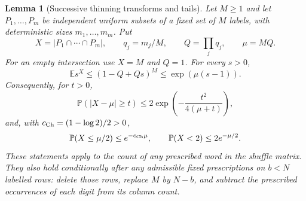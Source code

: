 \documentclass[11pt]{article}
\numberwithin{equation}{section}
\newtheorem{lemma}[lemma]{Lemma}
\newcommand{\E}{\mathbb E}
\newcommand{\Pp}{\mathbb P}
\newcommand{\1}{\mathbf 1}
\begin{document}
\begin{lemma}[Successive thinning transforms and tails]
\label{lem:successive-thinning-tail}
Let \(M\ge1\) and let \(P_1,\ldots,P_m\) be independent uniform
subsets of a fixed set of \(M\) labels, with deterministic sizes
\(m_1,\ldots,m_m\). Put
\[
 X=|P_1\cap\cdots\cap P_m|,\qquad
 q_j=m_j/M,\qquad Q=\prod_jq_j,\qquad \mu=MQ.
\]
For an empty intersection use \(X=M\) and \(Q=1\). For every \(s>0\),
\begin{equation}
\label{eq:thinning-transform}
 \E s^X\le(1-Q+Qs)^M\le \exp(\mu(s-1)).
\end{equation}
Consequently, for \(t>0\),
\begin{equation}
\label{eq:thinning-bernstein}
 \Pp(|X-\mu|\ge t)\le
 2\exp\left(-\frac{t^2}{4(\mu+t)}\right),
\end{equation}
and, with \(c_{\rm Ch}=(1-\log2)/2>0\),
\begin{equation}
\label{eq:thinning-lower-tail}
 \Pp(X\le\mu/2)\le e^{-c_{\rm Ch}\mu},
 \qquad \Pp(X<2)\le2e^{-\mu/2}.
\end{equation}
These statements apply to the count of any prescribed word in the shuffle
matrix. They also hold conditionally after any admissible fixed prescriptions
on \(b<N\) labelled rows: delete those rows, replace \(M\) by \(N-b\),
and subtract the prescribed occurrences of each digit from its column count.
\end{lemma}
\end{document}
